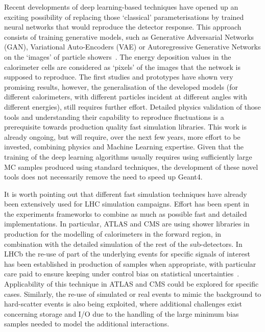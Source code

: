 Recent developments of deep
learning-based techniques have opened up an exciting possibility of
replacing those `classical' parameterisations by trained neural networks
that would reproduce the detector response. This approach consists of
training generative models, such as Generative Adversarial Networks
(GAN), Variational Auto-Encoders (VAE) or Autoregressive Generative
Networks on the `images' of particle 
showers~\cite{Paganini_2018, ML001-GAN, aishik_ghosh_2019_3599705, GAN-ATLAS}. The energy
deposition values in the calorimeter cells are considered as `pixels' of
the images that the network is supposed to reproduce. The first studies
and prototypes have shown very promising results, however, the
generalisation of the developed models (for different calorimeters, with
different particles incident at different angles with different
energies), still requires further effort. Detailed physics validation of
those tools and understanding their capability to reproduce
fluctuations is a prerequisite towards production quality fast
simulation libraries. This work is already ongoing, but will require,
over the next few years, more effort to be invested, combining
physics and Machine Learning expertise. Given that the training of the
deep learning algorithms usually requires using sufficiently large MC
samples produced using standard techniques, the development of these novel
tools does not necessarily remove the need to speed up Geant4.

It is worth pointing out that different fast simulation techniques have
already been extensively used for LHC simulation campaigns. Effort has
been spent in the experiments frameworks to combine as much as possible
fast and detailed implementations. In particular, ATLAS and CMS are using
shower libraries in production for the modelling of
calorimeters in the forward region, in combination with the detailed
simulation of the rest of the sub-detectors. In LHCb the re-use of part
of the underlying events for specific signals of interest has been
established in production of samples when appropriate, with particular
care paid to ensure keeping under control bias on statistical
uncertainties~\cite{LHCb02}. Applicability of this technique in ATLAS and CMS could be
explored for specific cases. Similarly, the re-use of simulated or real
events to mimic the background to hard-scatter events is also being exploited,
where additional challenges exist concerning storage and I/O due to the
handling of the large minimum bias samples needed to model the
additional interactions.

